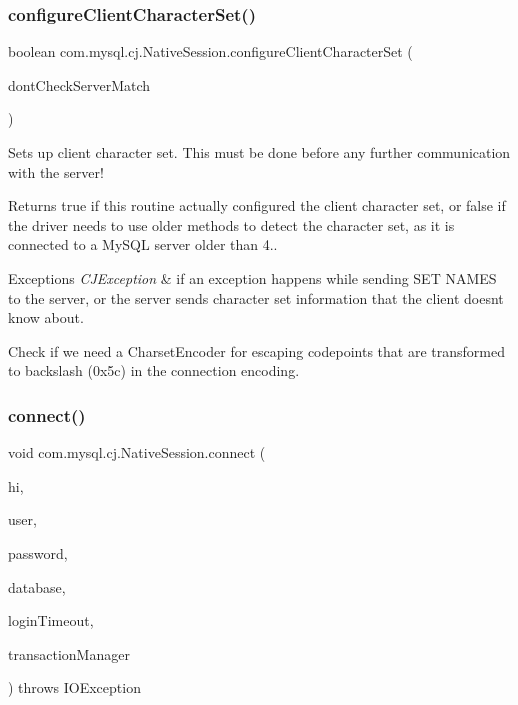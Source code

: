 \subsubsection{\texorpdfstring{configure\+Client\+Character\+Set()}{configureClientCharacterSet()}}
{\footnotesize\ttfamily boolean com.\+mysql.\+cj.\+Native\+Session.\+configure\+Client\+Character\+Set (\begin{DoxyParamCaption}\item[{boolean}]{dont\+Check\+Server\+Match }\end{DoxyParamCaption})}

Sets up client character set. This must be done before any further communication with the server!

\begin{DoxyReturn}{Returns}
true if this routine actually configured the client character set, or false if the driver needs to use \textquotesingle{}older\textquotesingle{} methods to detect the character set, as it is connected to a My\+S\+QL server older than 4.. 
\end{DoxyReturn}

\begin{DoxyExceptions}{Exceptions}
{\em C\+J\+Exception} & if an exception happens while sending \textquotesingle{}S\+ET N\+A\+M\+ES\textquotesingle{} to the server, or the server sends character set information that the client doesn\textquotesingle{}t know about. \\
\hline
\end{DoxyExceptions}
Check if we need a Charset\+Encoder for escaping codepoints that are transformed to backslash (0x5c) in the connection encoding.\mbox{\label{classcom_1_1mysql_1_1cj_1_1_native_session_ae8e367a5aef181ed59a6aa6cb2345946}} 
\subsubsection{\texorpdfstring{connect()}{connect()}}
{\footnotesize\ttfamily void com.\+mysql.\+cj.\+Native\+Session.\+connect (\begin{DoxyParamCaption}\item[{\mbox{\hyperlink{classcom_1_1mysql_1_1cj_1_1conf_1_1_host_info}{Host\+Info}}}]{hi,  }\item[{String}]{user,  }\item[{String}]{password,  }\item[{String}]{database,  }\item[{int}]{login\+Timeout,  }\item[{\mbox{\hyperlink{interfacecom_1_1mysql_1_1cj_1_1_transaction_event_handler}{Transaction\+Event\+Handler}}}]{transaction\+Manager }\end{DoxyParamCaption}) throws I\+O\+Exception}

